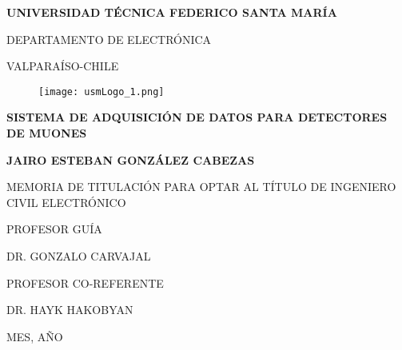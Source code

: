

\pagestyle{empty}


\begin{center}

\large \textbf{UNIVERSIDAD TÉCNICA FEDERICO SANTA MARÍA}

\vspace{3mm}

\normalsize DEPARTAMENTO DE ELECTRÓNICA

\vspace{3mm}

\normalsize VALPARAÍSO-CHILE

\vspace{4mm}
		\begin{figure}[H]
			\centering
			\texttt{[image: usmLogo\_1.png]}
		\end{figure}
\vspace{2mm}

\Large{\bf SISTEMA DE ADQUISICIÓN DE DATOS PARA DETECTORES DE MUONES}

\vspace{10mm}



\large \textbf{JAIRO ESTEBAN GONZÁLEZ CABEZAS}

\vspace{10mm}

\normalsize
MEMORIA DE TITULACIÓN PARA OPTAR AL TÍTULO DE INGENIERO CIVIL ELECTRÓNICO

\vspace{5mm}

PROFESOR GUÍA


DR. GONZALO CARVAJAL
\vspace{5mm}

PROFESOR CO-REFERENTE


DR. HAYK HAKOBYAN

\vspace{10mm}

MES, AÑO


\end{center}



\cleardoublepage

\vspace{50mm}

\begin{flushright}
  {\emph{\\}}
 \vspace{3mm}
  {\emph{\\}}


 
\end{flushright}
\vspace{170mm}
\begin{flushright}
{\emph{\\}}
\end{flushright}
